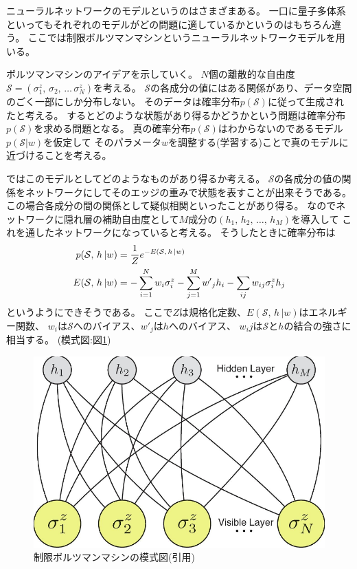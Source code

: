\documentclass[twocolumn,10pt,dvipdfmx,a4paper]{jsarticle}
\begin{document}
ニューラルネットワークのモデルというのはさまざまある。
一口に量子多体系といってもそれぞれのモデルがどの問題に適しているかというのはもちろん違う。
ここでは制限ボルツマンマシンというニューラルネットワークモデルを用いる。

ボルツマンマシンのアイデアを示していく。
\(N\)個の離散的な自由度\(\mathcal{S}=(\sigma_1^z,\,\sigma_2,\,\dots\, \sigma_N^z)\)を考える。
\(\mathcal{S}\)の各成分の値にはある関係があり、データ空間のごく一部にしか分布しない。
そのデータは確率分布\(p(\mathcal{S})\)に従って生成されたと考える。
するとどのような状態があり得るかどうかという問題は確率分布\(p(\mathcal{S})\)を求める問題となる。
真の確率分布\(p(\mathcal{S})\)はわからないのであるモデル\(p(\mathcal{S}|w)\)を仮定して
そのパラメータ\(w\)を調整する(学習する)ことで真のモデルに近づけることを考える。

ではこのモデルとしてどのようなものがあり得るか考える。
\(\mathcal{S}\)の各成分の値の関係をネットワークにしてそのエッジの重みで状態を表すことが出来そうである。
この場合各成分の間の関係として疑似相関といったことがあり得る。
なのでネットワークに隠れ層の補助自由度として\(M\)成分の\((h_1,\,h_2,\,\dots,\, h_M)\)を導入して
これを通したネットワークになっていると考える。
そうしたときに確率分布は
\begin{align}
    p(\mathcal{S},\,h\, | w ) &= \frac{1}{Z}e^{-E\qty(\mathcal{S},\,h\, | w )}\\
    E(\mathcal{S},\,h\, | w ) &= -\sum_{i=1}^{N} w_i \sigma_i^z - \sum_{j=1}^{M} {w'}_j h_i - \sum_{ij}w_{ij} \sigma_i^z h_j
\end{align}
というようにできそうである。
ここで\(Z\)は規格化定数、\(E(\mathcal{S},\,h\, | w )\)はエネルギー関数、
\(w_i\)は\(\mathcal{S}\)へのバイアス、\({w'}_j\)は\(h\)へのバイアス、
\(w_ij\)は\(\mathcal{S}\)と\(h\)の結合の強さに相当する。
(模式図:図\ref{fig:01})
\begin{figure}
    \centering
    \includegraphics[width=0.9\columnwidth]{01.png}
    \caption{制限ボルツマンマシンの模式図(引用\cite{Carleo-2017})}
    \label{fig:01}
\end{figure}
\end{document}

